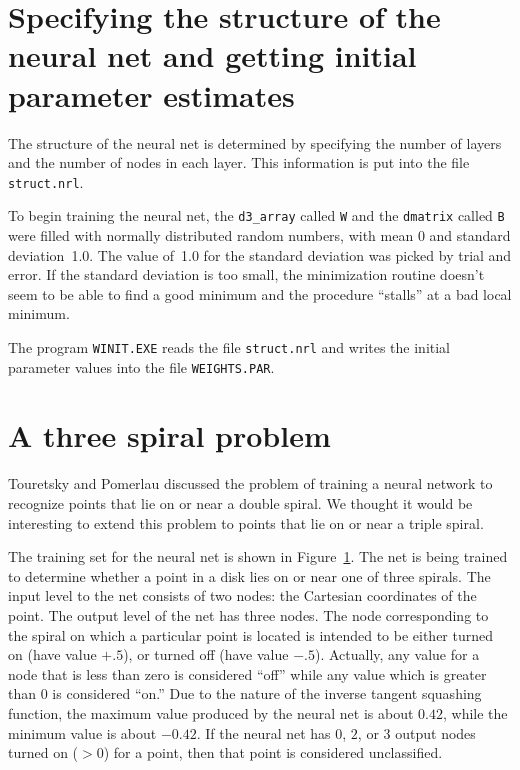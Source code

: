 \documentclass{admbmanual}
\begin{document}
\section{Specifying the structure of the neural net\br
  and getting initial parameter estimates}

The structure of the neural net is determined by specifying the number of layers
and the number of nodes in each layer. This information is put into the file
\texttt{struct.nrl}.

To begin training the neural net, the \texttt{d3\_array} called \texttt{W} and
the \texttt{dmatrix} called \texttt{B} were filled with normally distributed
random numbers, with mean 0 and standard deviation~1.0. The value of~1.0 for the
standard deviation was picked by trial and error. If the standard deviation is
too small, the minimization routine doesn't seem to be able to find a good
minimum and the procedure ``stalls'' at a bad local minimum.

The program \texttt{WINIT.EXE} reads the file \texttt{struct.nrl} and writes the
initial parameter values into the file \texttt{WEIGHTS.PAR}.

\section{A three spiral problem}

Touretsky and Pomerlau \cite{touretzkypomerlau1989} discussed the problem of
training a neural network to recognize points that lie on or near a double
spiral. We thought it would be interesting to extend this problem to points that
lie on or near a triple spiral.

\begin{figure}%
      \centering
        { \par}%
      \emptycaption{}%
      \label{fig:description-nn-01}
\end{figure}

The training set for the neural net is shown in
Figure~\ref{fig:description-nn-01}. %
The net is being trained to determine whether a point in a disk lies on or near
one of three spirals. The input level to the net consists of two nodes: the
Cartesian coordinates of the point. The output level of the net has three nodes.
The node corresponding to the spiral on which a particular point is located is
intended to be either turned on (have value $+.5$), or turned off (have value
$-.5$). Actually, any value for a node that is less than zero is considered
``off'' while any value which is greater than $0$ is considered ``on.'' Due to
the nature of the inverse tangent squashing function, the maximum value produced
by the neural net is about $0.42$, while the minimum value is about $-0.42$. If
the neural net has $0$, $2$, or $3$ output nodes turned on ($>0$) for a point,
then that point is considered unclassified.
\end{document}

